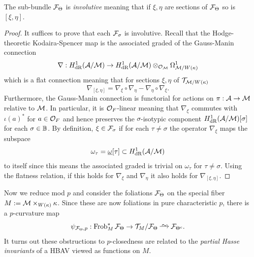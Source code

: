 \documentclass[main.tex]{subfiles}
\begin{document}
\begin{lemma}
The sub-bundle $\mathcal{F}_{\Theta}$ is \textit{involutive} meaning that if $\xi, \eta$ are sections of $\mathcal{F}_{\Theta}$ so is $[\xi, \eta]$.
\end{lemma}

\begin{proof}
It suffices to prove that each $\mathcal{F}_{\sigma}$ is involutive.
Recall that the Hodge-theoretic Kodaira-Spencer map is the associated graded of the Gauss-Manin connection
\[ \nabla : H^1_{\mathrm{dR}}(\mathcal{A}/\mathcal{M}) \to H^1_{\mathrm{dR}}(\mathcal{A}/\mathcal{M}) \otimes_{\mathcal{O}_{\mathcal{M}}} \Omega^1_{\mathcal{M} / W(\kappa)} \]
which is a flat connection meaning that for sections $\xi, \eta$ of $\mathcal{T}_{\mathcal{M} / W(\kappa)}$
\[ \nabla_{[\xi, \eta]} = \nabla_{\xi} \circ \nabla_{\eta} - \nabla_{\eta} \circ \nabla_{\xi}. \]
Furthermore, the Gauss-Manin connection is functorial for actions on $\pi : \mathcal{A} \to \mathcal{M}$ relative to $\mathcal{M}$. In particular, it is $\mathcal{O}_F$-linear meaning that $\nabla_{\xi}$ commutes with $\iota(a)^*$ for $a \in \mathcal{O}_F$ and hence preserves the $\sigma$-isotypic component $H^1_{\mathrm{dR}}(\mathcal{A}/\mathcal{M})[\sigma]$ for each $\sigma \in \mathbb{B}$. By definition, $\xi \in \mathcal{F}_{\sigma}$ if for each $\tau \neq \sigma$ the operator $\nabla_{\xi}$ maps the subspace
\[ \omega_{\tau} = \underline{\omega}[\tau] \subset H^1_{\mathrm{dR}}(\mathcal{A}/\mathcal{M}) \]
to itself since this means the associated graded is trivial on $\omega_{\tau}$ for $\tau \neq \sigma$. Using the flatness relation, if this holds for $\nabla_{\xi}$ and $\nabla_{\eta}$ it also holds for $\nabla_{[\xi, \eta]}$. 
\end{proof}

Now we reduce mod $p$ and consider the foliations $\mathcal{F}_{\Theta}$ on the special fiber $M := \mathcal{M} \times_{W(\kappa)} \kappa$. Since these are now foliations in pure characteristic $p$, there is a $p$-curvature map
\[ \psi_{\F_{\Theta}, p} : \Frob^*_M \F_{\Theta} \to \cT_{M} / \F_{\Theta} \iso \F_{\Theta^{c}}. \]
It turns out these obstructions to $p$-closedness are related to the \textit{partial Hasse invariants} of a HBAV viewed as functions on $M$. 
\end{document}
